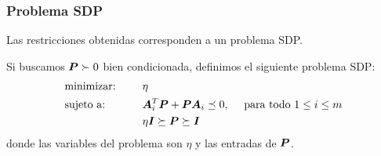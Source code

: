 \documentclass[aspectratio=169,12pt,spanish]{beamer}
\begin{document}

\begin{frame}
\frametitle{Problema SDP}

Las restricciones obtenidas corresponden a un problema SDP.

Si buscamos $\bm{P} \succ 0$ bien condicionada, definimos el siguiente problema SDP:
\begin{alignat*}{2}
  & \text{minimizar: } & & \eta \\
   & \text{sujeto a: } & \quad & \bm{A}_i^T \bm{P} + \bm{P} \bm{A}_i \preceq 0, \quad \text{ para todo } 1 \le i \le m \\
   &&& \eta \bm{I} \succeq \bm{P} \succeq \bm{I}
\end{alignat*}
donde las variables del problema son $\eta$ y las entradas de $\bm{P}$.

\end{frame}
\end{document}
